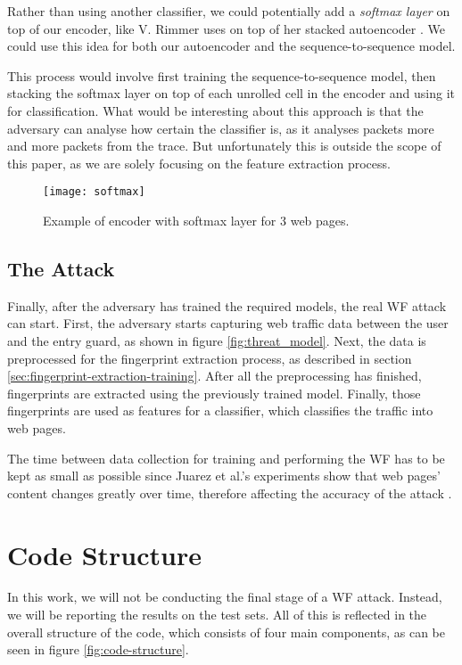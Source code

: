 Rather than using another classifier, we could potentially add a \textit{softmax layer} on top of our encoder, like V. Rimmer uses on top of her stacked autoencoder \cite{deeplearningthesis}.
We could use this idea for both our autoencoder and the sequence-to-sequence model.

This process would involve first training the sequence-to-sequence model, then stacking the softmax layer on top of each unrolled cell in the encoder and using it for classification.
What would be interesting about this approach is that the adversary can analyse how certain the classifier is, as it analyses packets more and more packets from the trace.
But unfortunately this is outside the scope of this paper, as we are solely focusing on the feature extraction process.

\begin{figure}[ht]
  \centering
  \texttt{[image: softmax]}
  \caption{Example of encoder with softmax layer for 3 web pages.}
  \label{fig:softmax}
\end{figure}

\newpage

\subsection{The Attack}

Finally, after the adversary has trained the required models, the real WF attack can start.
First, the adversary starts capturing web traffic data between the user and the entry guard, as shown in figure \ref{fig:threat_model}.
Next, the data is preprocessed for the fingerprint extraction process, as described in section \ref{sec:fingerprint-extraction-training}.
After all the preprocessing has finished, fingerprints are extracted using the previously trained model.
Finally, those fingerprints are used as features for a classifier, which classifies the traffic into web pages.

The time between data collection for training and performing the WF has to be kept as small as possible since Juarez et al.'s experiments show that web pages' content changes greatly over time, therefore affecting the accuracy of the attack \cite{wfpevaluation}.

\section{Code Structure} \label{sec:code-structure}

In this work, we will not be conducting the final stage of a WF attack.
Instead, we will be reporting the results on the test sets.
All of this is reflected in the overall structure of the code, which consists of four main components, as can be seen in figure \ref{fig:code-structure}.

